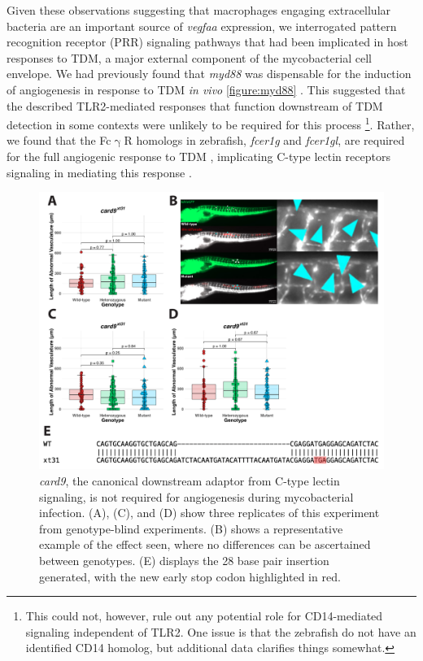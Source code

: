 Given these observations suggesting that macrophages engaging extracellular bacteria are an important source of \textit{vegfaa} expression, we interrogated pattern recognition receptor (PRR) signaling pathways that had been implicated in host responses to TDM, a major external component of the mycobacterial cell envelope. We had previously found that \textit{myd88} was dispensable for the induction of angiogenesis in response to TDM \textit{in vivo }\autoref{figure:myd88} \citep{Bowdish2009, Walton2018}. This suggested that the described TLR2-mediated responses that function downstream of TDM detection in some contexts were unlikely to be required for this process \footnote{This could not, however, rule out any potential role for CD14-mediated signaling independent of TLR2. One issue is that the zebrafish do not have an identified CD14 homolog, but additional data clarifies things somewhat.}. Rather, we found that the Fc$\upgamma$R homologs in zebrafish, \textit{fcer1g} and \textit{fcer1gl}, are required for the full angiogenic response to TDM \citep{Walton2018}, implicating C-type lectin receptors signaling in mediating this response \citep{Richardson2014, Zhao2014}.

\begin{figure}
\centering
\includegraphics[width=\textwidth]{images/card9.pdf}
\caption{\textit{card9}, the canonical downstream adaptor from C-type lectin signaling, is not required for angiogenesis during mycobacterial infection. (A), (C), and (D) show three replicates of this experiment from genotype-blind experiments. (B) shows a representative example of the effect seen, where no differences can be ascertained between genotypes. (E) displays the 28 base pair insertion generated, with the new early stop codon highlighted in red.}
\label{figure:card9}
\end{figure}

